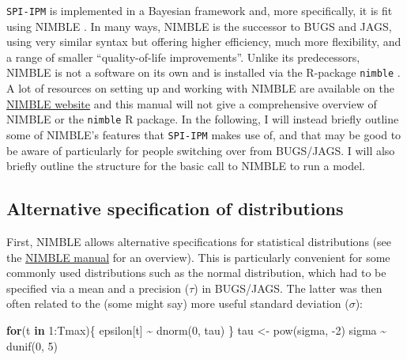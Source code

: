 \documentclass[
]{book}
\newenvironment{Shaded}{\begin{snugshade}}{\end{snugshade}}
\newcommand{\ControlFlowTok}[1]{\textcolor[rgb]{0.13,0.29,0.53}{\textbf{#1}}}
\newcommand{\DecValTok}[1]{\textcolor[rgb]{0.00,0.00,0.81}{#1}}
\newcommand{\FunctionTok}[1]{\textcolor[rgb]{0.00,0.00,0.00}{#1}}
\newcommand{\NormalTok}[1]{#1}
\newcommand{\OtherTok}[1]{\textcolor[rgb]{0.56,0.35,0.01}{#1}}
\newcommand{\SpecialCharTok}[1]{\textcolor[rgb]{0.00,0.00,0.00}{#1}}
\begin{document}
\texttt{SPI-IPM} is implemented in a Bayesian framework and, more specifically, it is
fit using NIMBLE \citep{devalpine2017}. In many ways, NIMBLE is the successor to
BUGS and JAGS, using very similar syntax but offering higher efficiency, much
more flexibility, and a range of smaller ``quality-of-life improvements''.
Unlike its predecessors, NIMBLE is not a software on its own and is installed
via the R-package \texttt{nimble} \citep{nimbleR}. A lot of resources on setting up and
working with NIMBLE are available on the \href{https://r-nimble.org/}{NIMBLE website}
and this manual will not give a comprehensive overview of NIMBLE or the
\texttt{nimble} R package.
In the following, I will instead briefly outline some of
NIMBLE's features that \texttt{SPI-IPM} makes use of, and that may be good to be aware
of particularly for people switching over from BUGS/JAGS. I will also briefly
outline the structure for the basic call to NIMBLE to run a model.

\hypertarget{alternative-specification-of-distributions}{%
\subsection{Alternative specification of distributions}\label{alternative-specification-of-distributions}}

First, NIMBLE allows alternative specifications for statistical distributions
(see the \href{https://r-nimble.org/manuals/NimbleUserManual.pdf}{NIMBLE manual}
for an overview). This is particularly convenient for some commonly used
distributions such as the normal distribution, which had to be specified via
a mean and a precision (\(\tau\)) in BUGS/JAGS. The latter was then often related
to the (some might say) more useful standard deviation (\(\sigma\)):

\begin{Shaded}
\begin{Highlighting}[]
\ControlFlowTok{for}\NormalTok{(t }\ControlFlowTok{in} \DecValTok{1}\SpecialCharTok{:}\NormalTok{Tmax)\{}
\NormalTok{  epsilon[t] }\SpecialCharTok{\textasciitilde{}} \FunctionTok{dnorm}\NormalTok{(}\DecValTok{0}\NormalTok{, tau)}
\NormalTok{\}}
\NormalTok{tau }\OtherTok{\textless{}{-}} \FunctionTok{pow}\NormalTok{(sigma, }\SpecialCharTok{{-}}\DecValTok{2}\NormalTok{)}
\NormalTok{sigma }\SpecialCharTok{\textasciitilde{}} \FunctionTok{dunif}\NormalTok{(}\DecValTok{0}\NormalTok{, }\DecValTok{5}\NormalTok{)}
\end{Highlighting}
\end{Shaded}
\end{document}
